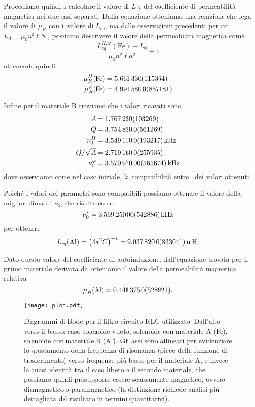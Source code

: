 \documentclass[
    prl,
    floatfix,
    reprint, 
    superscriptaddress, 
    altaffilletter, 
    amsmath, 
    amssymb, 
    a4paper]{revtex4-2}
\begin{document}
Procediamo quindi a calcolare il valore di $L$ e del coefficiente di permeabilità magnetica nei due casi separati. Dalla equazione  otteniamo una relazione che lega il valore di $\mu_R$ con il valore di $L_{eq}$, ma dalle osservazioni precedenti per cui $L_0 = \mu_0 n^2 \ell S$ , possiamo descrivere il valore della permeabilità magnetica come \[\frac{L_{eq}^{H,\varphi}(\text{Fe})-L_0}{\mu_0 n^2 \ell a^2}+1\] ottenendo quindi 
\begin{align*}
    \mu_R^H      (\text{Fe}) &= \num{5.66133 +- 0.115364}\\
    \mu_R^\varphi(\text{Fe}) &= \num{4.99158 +- 0.0857181}
\end{align*}

Infine per il materiale B troviamo che i valori ricavati sono
\begin{align*}
    A     &= \num{1.76723 +- 0.103269}\\
    Q     &= \num{3.75482 +- 0.0561269}\\
    \nu_0^H &= \SI{3.54911 +- 0.0193217}{\kilo\hertz}\\
    Q / \sqrt{A} &= \num{2.71916 +- 0.0255935} \\
    \nu_0^\varphi &= \SI[]{3.57097 +- 0.00565674}[]{\kilo\hertz}
\end{align*}
dove osserviamo come nel caso iniziale, la compatibilità entro \treSigma\ dei valori ottenuti.

Poiché i valori dei parametri sono compatibili possiamo ottenere il valore della miglior stima di $\nu_0$, che risulta essere \[\nu_0^* = \SI{3.56925 +- 0.00542886}{\kilo\hertz}\] per ottenere \[L_{eq}(\text{Al}) = \left(4\pi^2C\right)^{-1} = \SI{9.03782 +- 0.0833041}{\milli\henry}.\]

Dato questo valore del coefficiente di autoinduzione, dall'equazione trovata per il primo materiale derivata da  otteniamo il valore della permeabilità magnetica relativa \[\mu_R(\text{Al}) = \num{0.446375 +- 0.0528921}.\]

\begin{figure*}
    \texttt{[image: plot.pdf]}
    \caption{Diagrammi di Bode per il filtro circuito RLC utilizzato. Dall'alto verso il basso: caso solenoide vuoto, solenoide con materiale A (Fe), solenoide con materiale B (Al). Gli assi sono allineati per evidenziare lo spostamento della frequenza di risonanza (picco della funzione di trasferimento) verso frequenze più basse per il materiale A, e invece la quasi identità tra il caso libero e il secondo materiale, che possiamo quindi presupporre essere scarsamente magnetico, ovvero diamagnetico o paramagnetico (la distinzione richiede analisi più dettagliata del risultato in termini quantitativi). }
    \label{fig:plot}
\end{figure*}
\end{document}
